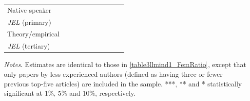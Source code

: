\begin{table}
\begin{threeparttable}
\begin{tabular}{p{4.5cm}S@{}S@{}S@{}S@{}S@{}S@{}S@{}S@{}S@{}}
            Native speaker                &               &               &               &               &           {}   &           {}   &           {}   &           {}   &           {}   \\
            \textit{JEL} (primary)        &               &               &               &               &               &               &           {}   &               &               \\
            Theory/empirical              &               &               &               &               &               &               &               &           {}   &               \\
            \textit{JEL} (tertiary)       &               &               &               &               &               &               &               &               &           {}   \\
            \bottomrule
        \end{tabular}
        \begin{tablenotes}
            \tiny
            \item \textit{Notes}. Estimates are identical to those in \autoref{table3llmind1_FemRatio}, except that only papers by less experienced authors (defined as having three or fewer previous top-five articles) are included in the sample. ***, ** and * statistically significant at 1\%, 5\% and 10\%, respectively.
        \end{tablenotes}
    \end{threeparttable}

\end{table}
